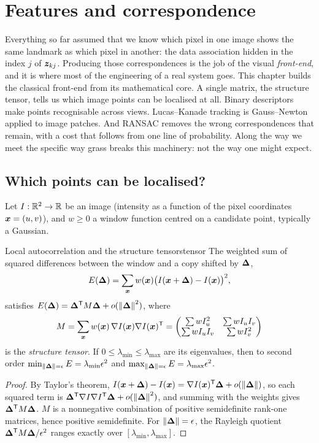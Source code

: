 \chapter{Features and correspondence}
\label{ch:features}

Everything so far assumed that we know which pixel in one image shows
the same landmark as which pixel in another: the data association hidden
in the index $j$ of $\bm{z}_{kj}$. Producing those correspondences is the
job of the visual \emph{front-end}, and it is where most of the
engineering of a real system goes. This chapter builds the classical
front-end from its mathematical core. A single matrix, the structure
tensor, tells us which image points can be localised at all. Binary
descriptors make points recognisable across views. Lucas--Kanade
tracking is Gauss--Newton applied to image patches. And RANSAC removes
the wrong correspondences that remain, with a cost that follows from one
line of probability. Along the way we meet the specific way grass breaks
this machinery: not the way one might expect.

\section{Which points can be localised?}

Let $I:\mathbb{R}^2\to\mathbb{R}$ be an image (intensity as a function of the pixel
coordinates $\bm{x}=(u,v)$), and $w\ge0$ a window function centred on
a candidate point, typically a Gaussian.

\begin{proposition}{Local autocorrelation and the structure tensor}{stensor}
The weighted sum of squared differences between the window and a copy
shifted by $\bm{\Delta}$,
\[
E(\bm{\Delta})=\sum_{\bm{x}}w(\bm{x})\bigl(I(\bm{x}+\bm{\Delta})
-I(\bm{x})\bigr)^2,
\]
satisfies $E(\bm{\Delta})=\bm{\Delta}^{\mathsf{T}} M\bm{\Delta}+o(\left\lVert \bm{\Delta}\right\rVert
^2)$, where
\[
M=\sum_{\bm{x}}w(\bm{x})\,\nabla I(\bm{x})\nabla I(\bm{x})^{\mathsf{T}}
=\begin{pmatrix}\sum wI_u^2&\sum wI_uI_v\\\sum wI_uI_v&\sum wI_v^2
\end{pmatrix}
\]
is the \emph{structure tensor}. If $0\le\lambda_{\min}\le\lambda_{\max}$
are its eigenvalues, then to second order
$\min_{\left\lVert \bm{\Delta}\right\rVert=\epsilon}E=\lambda_{\min}\epsilon^2$ and
$\max_{\left\lVert \bm{\Delta}\right\rVert=\epsilon}E=\lambda_{\max}\epsilon^2$.
\end{proposition}

\begin{proof}
By Taylor's theorem, $I(\bm{x}+\bm{\Delta})-I(\bm{x})=\nabla I(
\bm{x})^{\mathsf{T}}\bm{\Delta}+o(\left\lVert \bm{\Delta}\right\rVert)$, so each squared term is
$\bm{\Delta}^{\mathsf{T}}\nabla I\nabla I^{\mathsf{T}}\bm{\Delta}+o(\left\lVert \bm{\Delta}\right\rVert^2)$,
and summing with the weights gives $\bm{\Delta}^{\mathsf{T}} M\bm{\Delta}$. $M$ is
a nonnegative combination of positive semidefinite rank-one matrices,
hence positive semidefinite. For $\left\lVert \bm{\Delta}\right\rVert=\epsilon$, the
Rayleigh quotient $\bm{\Delta}^{\mathsf{T}} M\bm{\Delta}/\epsilon^2$ ranges exactly
over $[\lambda_{\min},\lambda_{\max}]$.
\end{proof}


